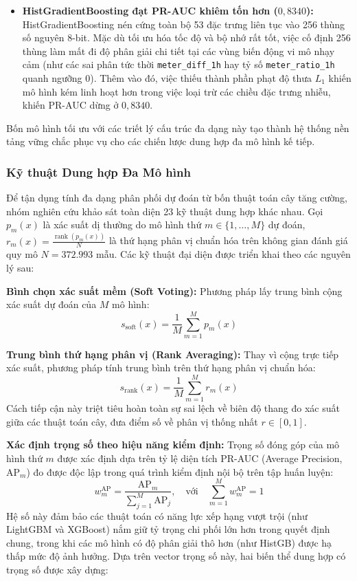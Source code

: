 \begin{itemize}
    \item \textbf{HistGradientBoosting đạt PR-AUC khiêm tốn hơn ($0{,}8340$):} HistGradientBoosting nén cứng toàn bộ 53 đặc trưng liên tục vào 256 thùng số nguyên 8-bit. Mặc dù tối ưu hóa tốc độ và bộ nhớ rất tốt, việc cố định 256 thùng làm mất đi độ phân giải chi tiết tại các vùng biến động vi mô nhạy cảm (như các sai phân tức thời \texttt{meter\_diff\_1h} hay tỷ số \texttt{meter\_ratio\_1h} quanh ngưỡng 0). Thêm vào đó, việc thiếu thành phần phạt độ thưa $L_1$ khiến mô hình kém linh hoạt hơn trong việc loại trừ các chiều đặc trưng nhiễu, khiến PR-AUC dừng ở $0{,}8340$.
\end{itemize}
Bốn mô hình tối ưu với các triết lý cấu trúc đa dạng này tạo thành hệ thống nền tảng vững chắc phục vụ cho các chiến lược dung hợp đa mô hình kế tiếp.

\subsubsection{Kỹ thuật Dung hợp Đa Mô hình}

Để tận dụng tính đa dạng phân phối dự đoán từ bốn thuật toán cây tăng cường, nhóm nghiên cứu khảo sát toàn diện 23 kỹ thuật dung hợp khác nhau. Gọi $p_m(x)$ là xác suất dị thường do mô hình thứ $m \in \{1, \dots, M\}$ dự đoán, $r_m(x) = \frac{\operatorname{rank}(p_m(x))}{N}$ là thứ hạng phân vị chuẩn hóa trên không gian đánh giá quy mô $N = 372.993$ mẫu. Các kỹ thuật đại diện được triển khai theo các nguyên lý sau:

\textbf{Bình chọn xác suất mềm (Soft Voting):} Phương pháp lấy trung bình cộng xác suất dự đoán của $M$ mô hình:
\begin{equation*}
    s_{\mathrm{soft}}(x) = \frac{1}{M}\sum_{m=1}^{M}p_m(x)
\end{equation*}

\textbf{Trung bình thứ hạng phân vị (Rank Averaging):} Thay vì cộng trực tiếp xác suất, phương pháp tính trung bình trên thứ hạng phân vị chuẩn hóa:
\begin{equation*}
    s_{\mathrm{rank}}(x) = \frac{1}{M}\sum_{m=1}^{M}r_m(x)
\end{equation*}
Cách tiếp cận này triệt tiêu hoàn toàn sự sai lệch về biên độ thang đo xác suất giữa các thuật toán cây, đưa điểm số về phân vị thống nhất $r \in [0, 1]$.

\textbf{Xác định trọng số theo hiệu năng kiểm định:} Trọng số đóng góp của mô hình thứ $m$ được xác định dựa trên tỷ lệ diện tích PR-AUC (Average Precision, $\mathrm{AP}_m$) đo được độc lập trong quá trình kiểm định nội bộ trên tập huấn luyện:
\begin{equation*}
    w_m^{\mathrm{AP}} = \frac{\mathrm{AP}_m}{\sum_{j=1}^{M}\mathrm{AP}_j}, \quad \text{với} \quad \sum_{m=1}^{M} w_m^{\mathrm{AP}} = 1
\end{equation*}
Hệ số này đảm bảo các thuật toán có năng lực xếp hạng vượt trội (như LightGBM và XGBoost) nắm giữ tỷ trọng chi phối lớn hơn trong quyết định chung, trong khi các mô hình có độ phân giải thô hơn (như HistGB) được hạ thấp mức độ ảnh hưởng. Dựa trên vector trọng số này, hai biến thể dung hợp có trọng số được xây dựng:

